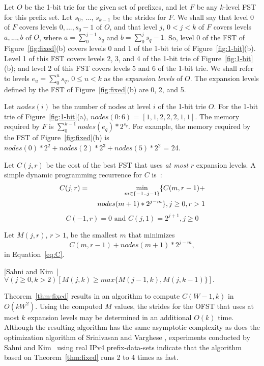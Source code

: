 Let $O$ be the 1-bit trie for the given set of prefixes, and let
$F$ be any $k$-level FST for this prefix set. Let $s_0$, $...$, $s_{k-1}$
be the strides for $F$. We shall say that level 0 of $F$ covers
levels $0, ... , s_0 - 1$ of $O$, and that level $j$, $0 < j < k$ of
$F$ covers levels $a, ..., b$ of $O$, where $a = \sum_0^{j-1} s_q$
and $b = \sum_0^j s_q - 1$. So, level 0 of the FST of Figure~\ref{fig:fixed}(b)
covers levels 0 and 1 of the 1-bit trie of Figure~\ref{fig:1-bit}(b).
Level 1 of this FST covers levels 2, 3, and 4 of the 1-bit trie of
Figure~\ref{fig:1-bit}(b); and
level 2 of this FST covers levels 5 and 6 of the 1-bit trie.
We shall refer to levels $e_u = \sum_0^u s_q$, $0 \leq u < k$ as
the {\em expansion levels} of $O$. The expansion levels defined by the FST of
Figure~\ref{fig:fixed}(b) are 0, 2, and 5.

Let $nodes(i)$ be the number of nodes at level $i$ of the 1-bit trie $O$.
For the 1-bit trie of Figure~\ref{fig:1-bit}(a), $nodes(0:6)$ = $[1, 1, 2, 2,
2, 1, 1]$.
The memory required by $F$ is $\sum_0^{k-1} nodes(e_q) * 2^{s_q}$.
For example, the memory required by the FST of Figure~\ref{fig:fixed}(b)
is $nodes(0) * 2^2 + nodes(2) * 2^3 + nodes(5) * 2^2$ = 24.

Let $C(j,r)$ be the
cost of the best FST that uses {\em at most} $r$
expansion levels.
A simple dynamic programming recurrence for $C$ is~\cite{sahni1}:
\begin{eqnarray}
C(j,r) &=&  \min_{m \in \{-1..j-1\}} \{C(m,r-1) +\nonumber\\
& & \hspace{0.05in} nodes(m+1)*2^{j-m} \}, j \geq 0, r > 1\label{eq:C}
\end{eqnarray}
\begin{equation}\label{eq:CC}
C(-1,r) = 0 \mbox{  and  }
C(j,1) = 2^{j+1}, j \geq 0
\end{equation}


Let $M(j,r)$, $r > 1$, be the smallest $m$ that minimizes
	\[ C(m,r-1) + nodes(m+1)*2^{j-m}, \]
in Equation~\ref{eq:C}.

\begin{theorem}\label{thm:fixed}[Sahni and Kim~\cite{sahni1}]
$ \forall (j\geq 0, k>2) [ M(j,k) \geq max\{M(j-1,k), M(j,k-1)\} ]. $
\end{theorem}


Theorem~\ref{thm:fixed} results in an
algorithm to
compute $C(W-1,k)$
in $O(kW^2)$. Using the computed $M$ values, the strides for
the OFST that uses at
most $k$ expansion levels may be determined in an additional
$O(k)$ time.
Although the resulting algorithm has the same
asymptotic complexity as does the optimization algorithm of
Srinivasan and Varghese \cite{sri:expansion},
experiments conducted by Sahni and Kim~\cite{sahni1} using real IPv4
prefix-data-sets
indicate that the algorithm based on Theorem~\ref{thm:fixed}
runs 2 to 4 times as fast.



